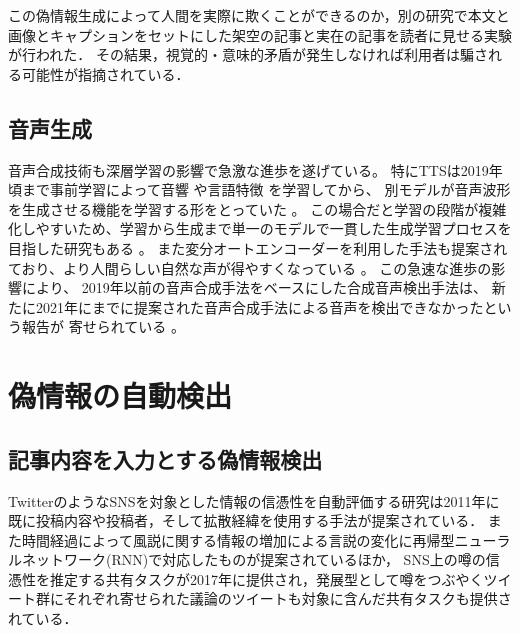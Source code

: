 この偽情報生成によって人間を実際に欺くことができるのか，別の研究で本文と画像とキャプションをセットにした架空の記事と実在の記事を読者に見せる実験が行われた．
その結果，視覚的・意味的矛盾が発生しなければ利用者は騙される可能性が指摘されている\cite{tan-etal-2020-detecting}．

\subsection{音声生成}
音声合成技術も深層学習の影響で急激な進歩を遂げている。
特にTTSは2019年頃まで事前学習によって音響 \cite{6639215,8461368}や言語特徴 \cite{vandenoord16_ssw}を学習してから、
別モデルが音声波形を生成させる機能を学習する形をとっていた \cite{vandenoord16_ssw,pmlr-v80-kalchbrenner18a}。
この場合だと学習の段階が複雑化しやすいため、学習から生成まで単一のモデルで一貫した生成学習プロセスを目指した研究もある \cite{wang17n_interspeech,ren2021fastspeech,donahue2021endtoend}。
また変分オートエンコーダーを利用した手法も提案されており、より人間らしい自然な声が得やすくなっている \cite{pmlr-v139-kim21f,https://doi.org/10.48550/arxiv.2205.04421}。
この急速な進歩の影響により、
2019年以前の音声合成手法をベースにした合成音声検出手法は、
新たに2021年にまでに提案された音声合成手法による音声を検出できなかったという報告が
寄せられている \cite{yamagishi21_asvspoof,yu_icmece}。

\section{偽情報の自動検出}
\subsection{記事内容を入力とする偽情報検出}
TwitterのようなSNSを対象とした情報の信憑性を自動評価する研究は2011年に既に投稿内容や投稿者，そして拡散経緯を使用する手法が提案されている\cite{10.1145/1963405.1963500}．
また時間経過によって風説に関する情報の増加による言説の変化に再帰型ニューラルネットワーク(RNN)で対応したものが提案されている\cite{10.5555/3061053.3061153}ほか，
SNS上の噂の信憑性を推定する共有タスクが2017年に提供され\cite{derczynski-etal-2017-semeval}，発展型として噂をつぶやくツイート群にそれぞれ寄せられた議論のツイートも対象に含んだ共有タスクも提供されている\cite{gorrell-etal-2019-semeval}．

